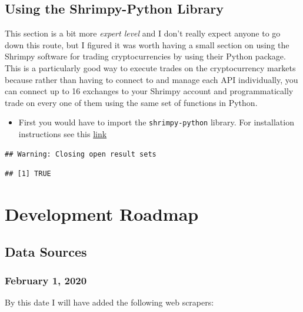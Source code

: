 \documentclass[
]{book}
\providecommand{\tightlist}{%
  \setlength{\itemsep}{0pt}\setlength{\parskip}{0pt}}
\begin{document}
\hypertarget{using-the-shrimpy-python-library}{%
\section{Using the Shrimpy-Python Library}\label{using-the-shrimpy-python-library}}

This section is a bit more \emph{expert level} and I don't really expect anyone to go down this route, but I figured it was worth having a small section on using the Shrimpy software for trading cryptocurrencies by using their Python package. This is a particularly good way to execute trades on the cryptocurrency markets because rather than having to connect to and manage each API individually, you can connect up to 16 exchanges to your Shrimpy account and programmatically trade on every one of them using the same set of functions in Python.

\begin{itemize}
\tightlist
\item
  First you would have to import the \texttt{shrimpy-python} library. For installation instructions see this \href{}{link}
\end{itemize}

\begin{verbatim}
## Warning: Closing open result sets
\end{verbatim}

\begin{verbatim}
## [1] TRUE
\end{verbatim}

\hypertarget{development-roadmap}{%
\chapter{Development Roadmap}\label{development-roadmap}}

\hypertarget{data-sources}{%
\section{Data Sources}\label{data-sources}}

\hypertarget{february-1-2020}{%
\subsection{February 1, 2020}\label{february-1-2020}}

By this date I will have added the following web scrapers:
\end{document}
